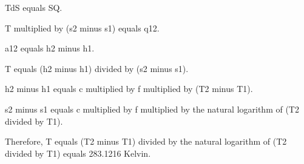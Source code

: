 TdS equals SQ.  

T multiplied by (s2 minus s1) equals q12.  

a12 equals h2 minus h1.  

T equals (h2 minus h1) divided by (s2 minus s1).  

h2 minus h1 equals c multiplied by f multiplied by (T2 minus T1).  

s2 minus s1 equals c multiplied by f multiplied by the natural logarithm of (T2 divided by T1).  

Therefore, T equals (T2 minus T1) divided by the natural logarithm of (T2 divided by T1) equals 283.1216 Kelvin.